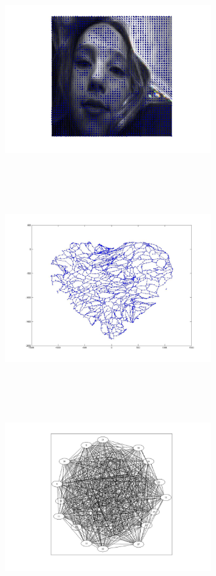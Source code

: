 \includegraphics[width=9.0cm,height=9.0cm]{images/GraphTheory/Raymond_TensorField.jpg}
\includegraphics[width=9.0cm,height=9.0cm]{images/GraphTheory/RoadMap.jpg}
\includegraphics[width=9.0cm,height=9.0cm]{images/GraphTheory/WellConnectedWithRedBlackOrder_Bipatate.jpg}
